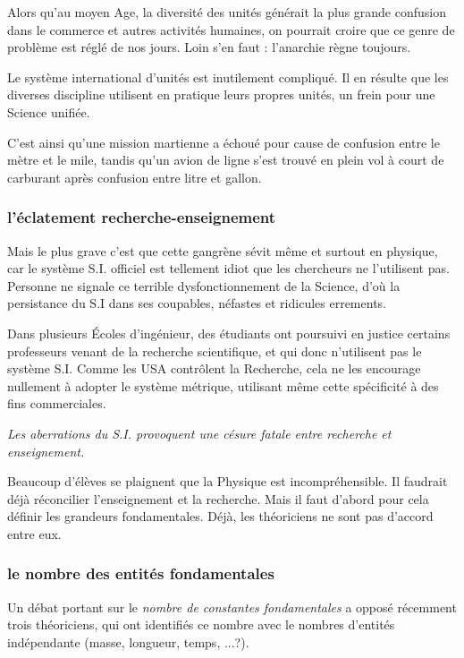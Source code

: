 \documentclass[a4paper,12pt]{article}
\begin{document}
 Alors qu'au moyen Age, la diversité des unités générait la plus grande confusion dans le commerce et autres activités humaines, on pourrait croire que ce genre de problème est réglé de nos jours. Loin s'en faut   : l'anarchie règne toujours.
 

Le système international d'unités est inutilement compliqué. Il en résulte que les diverses discipline utilisent en pratique leurs propres unités, un frein pour  une Science unifiée. 


C'est ainsi qu'une mission martienne a échoué pour cause de confusion entre le mètre et le mile, tandis qu'un avion de ligne s'est trouvé en plein vol à court de carburant après confusion entre litre et gallon.

\subsubsection{l'éclatement recherche-enseignement}

Mais le plus grave c'est que cette gangrène sévit même et surtout en physique, car le système S.I. officiel est tellement idiot que les chercheurs ne l'utilisent pas. Personne ne signale ce terrible dysfonctionnement de la Science, d'où la persistance du S.I dans ses coupables, néfastes et ridicules errements.


Dans plusieurs Écoles d'ingénieur, des étudiants ont poursuivi en justice certains professeurs venant de la recherche scientifique, et qui donc n'utilisent pas le système S.I. Comme les USA contrôlent la Recherche, cela ne les encourage nullement à adopter le système métrique, utilisant même cette spécificité à des fins commerciales.


\textit{Les aberrations du S.I. provoquent une césure fatale entre recherche et enseignement.}

Beaucoup d'élèves se plaignent que la Physique est incompréhensible. Il faudrait déjà réconcilier l'enseignement et la recherche. Mais il faut d'abord pour cela définir les grandeurs fondamentales. Déjà, les théoriciens ne sont pas d'accord entre eux. 

\subsubsection{le nombre des entités fondamentales}

Un débat portant sur le \textit{nombre de constantes fondamentales} a opposé récemment trois théoriciens, qui ont identifiés ce nombre avec le nombres d'entités indépendante (masse, longueur, temps, ...?). 
\end{document}
